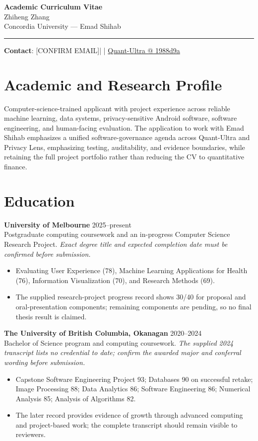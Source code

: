 \documentclass[11pt]{article}
\makeatletter
\newcommand{\ApplicantName}{Zhiheng Zhang}
\newcommand{\ApplicantEmail}{[CONFIRM EMAIL]}
\newcommand{\ApplicantPhone}{[CONFIRM PHONE]}
\newcommand{\ApplicantGitHub}{\href{https://github.com/zhiheng-zhang-Mera/Quant-Ultra/tree/1988d9a8530da91a8158de864d098ea869098923}{Quant-Ultra @ 1988d9a}}
\makeatother
\begin{document}
\begin{center}
{\LARGE\bfseries Academic Curriculum Vitae}\\[0.25em]
{\large \ApplicantName}\\
Concordia University --- Emad Shihab
\end{center}
\vspace{0.35em}\hrule\vspace{0.65em}

\textbf{Contact}: \ApplicantEmail\quad | \quad \ApplicantPhone\quad | \quad \ApplicantGitHub

\section*{Academic and Research Profile}
Computer-science-trained applicant with project experience across reliable machine learning, data systems, privacy-sensitive Android software, software engineering, and human-facing evaluation. The application to work with Emad Shihab emphasizes a unified software-governance agenda across Quant-Ultra and Privacy Lens, emphasizing testing, auditability, and evidence boundaries, while retaining the full project portfolio rather than reducing the CV to quantitative finance.

\section*{Education}
\textbf{University of Melbourne} \hfill 2025--present\\
Postgraduate computing coursework and an in-progress Computer Science Research Project. \textit{Exact degree title and expected completion date must be confirmed before submission.}
\begin{itemize}
\item Evaluating User Experience (78), Machine Learning Applications for Health (76), Information Visualization (70), and Research Methods (69).
\item The supplied research-project progress record shows 30/40 for proposal and oral-presentation components; remaining components are pending, so no final thesis result is claimed.
\end{itemize}

\textbf{The University of British Columbia, Okanagan} \hfill 2020--2024\\
Bachelor of Science program and computing coursework. \textit{The supplied 2024 transcript lists no credential to date; confirm the awarded major and conferral wording before submission.}
\begin{itemize}
\item Capstone Software Engineering Project 93; Databases 90 on successful retake; Image Processing 88; Data Analytics 86; Software Engineering 86; Numerical Analysis 85; Analysis of Algorithms 82.
\item The later record provides evidence of growth through advanced computing and project-based work; the complete transcript should remain visible to reviewers.
\end{itemize}
\end{document}
